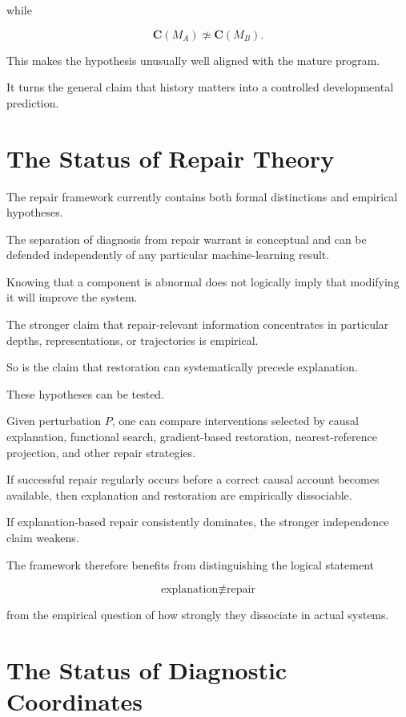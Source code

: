 \documentclass[11pt]{article}
\theoremstyle{remark}
\begin{document}
while

\begin{equation}
\mathbf{C}(M_A)\not\simeq\mathbf{C}(M_B).
\end{equation}

This makes the hypothesis unusually well aligned with the mature program.

It turns the general claim that history matters into a controlled developmental
prediction.

\section{The Status of Repair Theory}

The repair framework currently contains both formal distinctions and empirical
hypotheses.

The separation of diagnosis from repair warrant is conceptual and can be
defended independently of any particular machine-learning result.

Knowing that a component is abnormal does not logically imply that modifying it
will improve the system.

The stronger claim that repair-relevant information concentrates in particular
depths, representations, or trajectories is empirical.

So is the claim that restoration can systematically precede explanation.

These hypotheses can be tested.

Given perturbation $P$, one can compare interventions selected by causal
explanation, functional search, gradient-based restoration, nearest-reference
projection, and other repair strategies.

If successful repair regularly occurs before a correct causal account becomes
available, then explanation and restoration are empirically dissociable.

If explanation-based repair consistently dominates, the stronger independence
claim weakens.

The framework therefore benefits from distinguishing the logical statement

\begin{equation}
\text{explanation}\not\equiv\text{repair}
\end{equation}

from the empirical question of how strongly they dissociate in actual systems.

\section{The Status of Diagnostic Coordinates}
\end{document}
